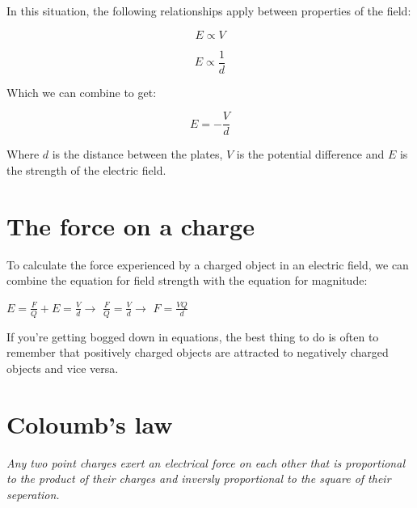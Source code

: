 \documentclass{article}
\begin{document}
In this situation, the following relationships apply between properties of the
field:

\[
	E \propto V
\]

\[
	E \propto \frac{1}{d}
\]

Which we can combine to get: 

\[
	E = -\frac{V}{d}
\]

Where $d$ is the distance between the plates, $V$ is the potential difference
and $E$ is the strength of the electric field.


\section*{The force on a charge}

To calculate the force experienced by a charged object in an electric field, we can combine the equation for field strength with the equation for magnitude:

\begin{center}
	$E = \frac{F}{Q} + E = \frac{V}{d} \rightarrow $
	$\frac{F}{Q} = \frac{V}{d}	\rightarrow $
	$F = \frac{VQ}{d}$
\end{center}

If you're getting bogged down in equations, the best thing to do is often to remember that positively charged objects are attracted to negatively charged objects and vice versa.

\section*{Coloumb's law}


{\it Any two point charges exert an electrical force on each other that is
proportional to the product of their charges and inversly proportional to the
square of their seperation.}

\end{document}
